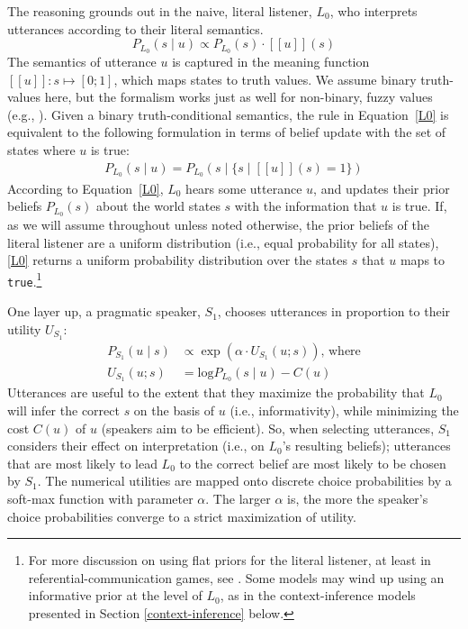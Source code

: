 \documentclass{sp}
\newcommand{\sem}[1]{\ensuremath{[\![#1]\!]}}
\begin{document}
The reasoning grounds out in the naive, literal listener, $L_0$, who interprets utterances according to their literal semantics.
\begin{equation} \label{L0}
P_{L_0}(s \mid u) \propto P_{L_0}(s) \cdot \sem{u}(s)
\end{equation}
The semantics of utterance $u$ is captured in the meaning function $\sem{u} \colon s \mapsto [0;1]$, which maps states to truth values.
We assume binary truth-values here, but the formalism works just as well for non-binary, fuzzy values (e.g., \citealp{degenetal2020}).
Given a binary truth-conditional semantics, the rule in Equation~\eqref{L0} is equivalent to the following formulation in terms of belief update with the set of states where $u$ is true:
\begin{align}
  \label{eq:1}
  P_{L_{0}}(s \mid u) = P_{L_{0}}(s \mid \{ s \mid \sem{u}(s) = 1\})
\end{align}
According to Equation~\eqref{L0}, $L_0$ hears some utterance $u$, and updates their prior beliefs $P_{L_{0}}(s)$ about the world states $s$ with the information that $u$ is true.
If, as we will assume throughout unless noted otherwise, the prior beliefs of the literal listener are a uniform distribution (i.e., equal probability for all states), \eqref{L0} returns a uniform probability distribution over the states $s$ that $u$ maps to \texttt{true}.\footnote{For more discussion on using flat priors for the literal listener, at least in referential-communication games, see \cite{qingfranke2015}. Some models may wind up using an informative prior at the level of $L_0$, as in the context-inference models presented in Section \ref{context-inference} below.}

One layer up, a pragmatic speaker, $S_1$, chooses utterances in proportion to their utility $U_{S_{1}}$:
\begin{align} \label{S1}
  P_{S_1}(u \mid s) & \propto \exp (\alpha \cdot U_{S_1}(u;s))\text{, where} \\
  U_{S_1}(u; s) & = \textrm{log}P_{L_0}(s \mid u) - C(u) \nonumber
\end{align}
Utterances are useful to the extent that they maximize the probability that $L_0$ will infer the correct $s$ on the basis of $u$ (i.e., informativity), while minimizing the cost $C(u)$ of $u$ (speakers aim to be efficient). So, when selecting utterances, $S_1$ considers their effect on interpretation (i.e., on $L_0$'s resulting beliefs); utterances that are most likely to lead $L_0$ to the correct belief are most likely to be chosen by $S_1$.
The numerical utilities are mapped onto discrete choice probabilities by a soft-max function with parameter $\alpha$.
The larger $\alpha$ is, the more the speaker's choice probabilities converge to a strict maximization of utility.
\end{document}
